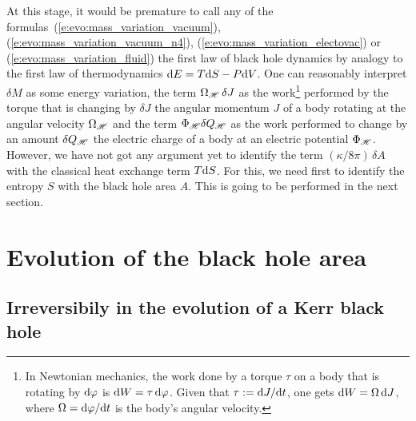 At this stage, it would be premature to call any of the formulas~(\ref{e:evo:mass_variation_vacuum}),
(\ref{e:evo:mass_variation_vacuum_n4}), (\ref{e:evo:mass_variation_electovac})
or (\ref{e:evo:mass_variation_fluid})
the first law of black hole dynamics by analogy to the first law of thermodynamics
$\mathrm{d} E = T \mathrm{d} S - P \mathrm{d} V$. One can reasonably interpret $\delta M$
as some energy variation, the term
$\Omega_{\mathscr{H}} \, \delta J$ as the work\footnote{In Newtonian mechanics, the
work done by a torque $\tau$ on a body that is rotating by $\mathrm{d}\varphi$
is $\mathrm{d} W = \tau \, \mathrm{d}\varphi$. Given that $\tau := \mathrm{d} J/\mathrm{d} t$, one gets $\mathrm{d} W = \Omega \, \mathrm{d} J$, where
$\Omega = \mathrm{d}\varphi/\mathrm{d} t$ is the body's angular velocity.} performed by the torque
that is changing by $\delta J$ the angular momentum $J$ of a body rotating
at the angular velocity $\Omega_{\mathscr{H}}$ and the term $\Phi_{\mathscr{H}} \delta Q_{\mathscr{H}}$
as the work performed to change by an amount $\delta Q_{\mathscr{H}}$ the electric charge
of a body at an electric potential $\Phi_{\mathscr{H}}$.
However, we have not got any argument yet
to identify the term $(\kappa/8\pi) \, \delta A$ with the classical heat exchange term $T\mathrm{d} S$.
For this, we need first to identify the entropy $S$ with the black hole area $A$.
This is going to be performed in the next section.



\section{Evolution of the black hole area}

\subsection{Irreversibily in the evolution of a Kerr black hole} \label{s:evo:irreversible_mass}

